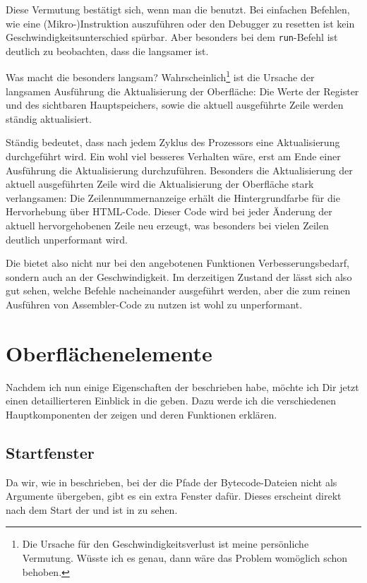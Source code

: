 Diese Vermutung bestätigt sich, wenn man die \mdg{} benutzt. Bei einfachen Befehlen, wie eine (Mikro-)Instruktion auszuführen oder den Debugger zu resetten ist kein Geschwindigkeitsunterschied spürbar. Aber besonders bei dem \texttt{run}-Befehl ist deutlich zu beobachten, dass die \mdg{} langsamer ist.

Was macht die \mdg{} besonders langsam? Wahrscheinlich\footnote{Die Ursache für den Geschwindigkeitsverlust ist meine persönliche Vermutung. Wüsste ich es genau, dann wäre das Problem womöglich schon behoben.} ist die Ursache der langsamen Ausführung die Aktualisierung der Oberfläche: Die Werte der Register und des sichtbaren Hauptspeichers, sowie die aktuell ausgeführte Zeile werden ständig aktualisiert.

Ständig bedeutet, dass nach jedem Zyklus des Prozessors eine Aktualisierung durchgeführt wird. Ein wohl viel besseres Verhalten wäre, erst am Ende einer Ausführung die Aktualisierung durchzuführen. Besonders die Aktualisierung der aktuell ausgeführten Zeile wird die Aktualisierung der Oberfläche stark verlangsamen: Die Zeilennummernanzeige erhält die Hintergrundfarbe für die Hervorhebung über HTML-Code. Dieser Code wird bei jeder Änderung der aktuell hervorgehobenen Zeile neu erzeugt, was besonders bei vielen Zeilen deutlich unperformant wird.

Die \mdg{} bietet also nicht nur bei den angebotenen Funktionen Verbesserungsbedarf, sondern auch an der Geschwindigkeit. Im derzeitigen Zustand der \mdg{} lässt sich also gut sehen, welche Befehle nacheinander ausgeführt werden, aber die \mdg{} zum reinen Ausführen von Assembler-Code zu nutzen ist wohl zu unperformant.

\section{Oberflächenelemente}
Nachdem ich nun einige Eigenschaften der \mdg{} beschrieben habe, möchte ich Dir jetzt einen detaillierteren Einblick in die \mdg{} geben. Dazu werde ich die verschiedenen Hauptkomponenten der \mdg{} zeigen und deren Funktionen erklären.

\subsection{Startfenster}
Da wir, wie in  beschrieben, bei der \mdg{} die Pfade der Bytecode-Dateien nicht als Argumente übergeben, gibt es ein extra Fenster dafür. Dieses erscheint direkt nach dem Start der \mdg{} und ist in  zu sehen.

